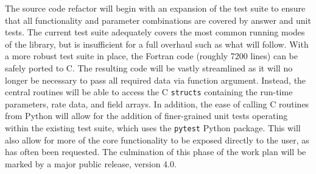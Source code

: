 The source code refactor will begin with an expansion of the
test suite to ensure that all functionality and parameter
combinations are covered by answer and unit tests.  The current
test suite adequately covers the most common running modes of the
library, but is insufficient for a full overhaul such as what will
follow.  With a more robust test suite in place, the Fortran code (roughly 7200
lines) can be safely ported to C.  The resulting code will
be vastly streamlined as it will no longer be necessary to pass all
required data via function argument.  Instead, the central routines
will be able to access the C \texttt{structs} containing the run-time
parameters, rate data, and field arrays.  In addition, the ease of
calling C routines from Python will allow for the addition of
finer-grained unit tests operating within the existing test suite,
which uses the \texttt{pytest} Python package.  This will also allow
for more of the core functionality to be exposed directly to the user,
as has often been requested.  The culmination of this phase of the
work plan will be marked by a major public release, \grackle{} version
4.0.


